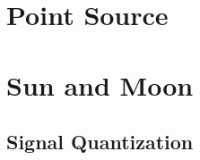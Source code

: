 \documentclass[12pt]{article}
\begin{document}
\section{Point Source}
\section{Sun and Moon}

\subsection{Signal Quantization}

%

\enddocument
\end{document}
